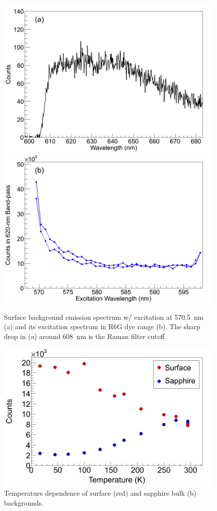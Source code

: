 \begin{figure} %
        \centering
                \includegraphics[width=.7\textwidth]{figures/surfaceBG_a.png}
                \includegraphics[width=.7\textwidth]{figures/surfaceBG_b.png}
                \caption{Surface background emission spectrum w/ excitation at 570.5~nm (a) and its excitation spectrum in R6G dye range (b).  The sharp drop in (a) around 608~nm is the Raman filter cutoff.}
\label{fig:surfBG}
\end{figure}

\begin{figure} %
        \centering
                \includegraphics[width=.6\textwidth]{figures/bg_temp_dep.png}
                \caption{Temperature dependence of surface (red) and sapphire bulk (b) backgrounds.}
\label{fig:BGtempDependence}
\end{figure}

